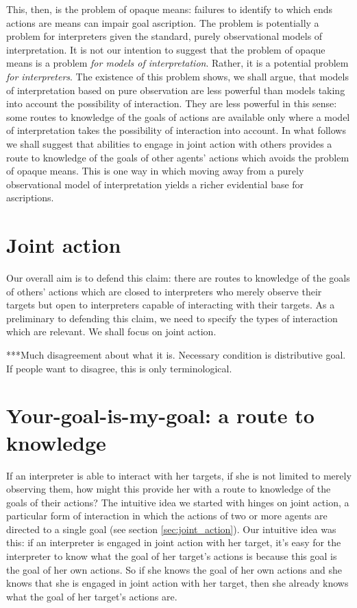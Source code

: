 \documentclass[14pt,a4paper]{extarticle}
\begin{document}
This, then, is the problem of opaque means:
failures to identify to which ends actions are means can impair goal ascription.
The problem is potentially a problem for interpreters given the standard, purely observational models of interpretation.
It is not our intention to suggest that the problem of opaque means is a problem \emph{for models of interpretation}.
Rather, it is a potential problem \emph{for interpreters}.
The existence of this problem shows, we shall argue, that models of interpretation based on pure observation are less powerful than models taking into account the possibility of interaction.
They are less powerful in this sense: 
some routes to knowledge of the goals of actions are available only where a model of interpretation takes the possibility of interaction into account.
In what follows we shall suggest that abilities to engage in joint action with others provides a route to knowledge of the goals of other agents' actions  which avoids the problem of opaque means.
This is one way in which moving away from a purely observational model of interpretation yields a richer evidential base for ascriptions.


\section{Joint action}
\label{sec:joint_action}
Our overall aim is to defend this claim:
there are routes to knowledge of the goals of others' actions
which are closed to
interpreters who merely observe their targets
but open to 
interpreters capable of interacting with their targets.
As a preliminary to defending this claim,
we need to specify the types of interaction which are relevant.
We shall focus on joint action.

***Much disagreement about what it is.
Necessary condition is distributive goal.
If people want to disagree, this is only terminological.



\section{Your-goal-is-my-goal: a route to knowledge}
If an interpreter is able to interact with her targets,
if she is not limited to merely observing them,
how might this provide her with a route to knowledge of the goals of their actions?
The intuitive idea we started with hinges on joint action, a particular form of interaction in which the actions of two or more agents are directed to a single goal (see section \vref{sec:joint_action}).
Our intuitive idea was this:
if an interpreter is engaged in joint action with her target, 
it's easy for the interpreter to know what the goal of her target's actions is because this goal is the goal of her own actions.
So if she knows the goal of her own actions and she knows that she is engaged in joint action with her target,
then she already knows what the goal of her target's actions are.
\end{document}
